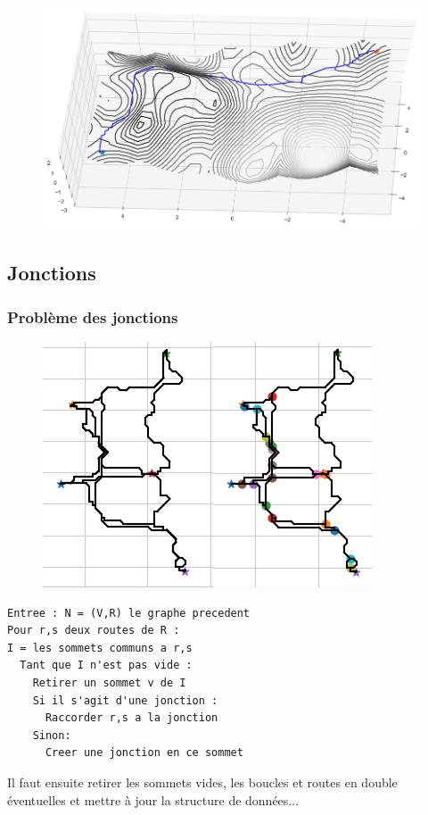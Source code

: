 \documentclass{beamer}[11pt]
\begin{document}
			\begin{frame}
				\begin{figure}[t]
					\centering
						\includegraphics[width=1\textwidth]{Pics/lacets.png}
				\end{figure}
			\end{frame}

		\subsection{Jonctions}

			\begin{frame}
				\frametitle{Problème des jonctions}
				\begin{figure}[t]
					\centering
						\includegraphics[width=.6\textwidth]{Pics/normcomp.png}
				\end{figure}
			\end{frame}

			\begin{frame}[fragile]
				\begin{verbatim}
Entree : N = (V,R) le graphe precedent
Pour r,s deux routes de R :
I = les sommets communs a r,s
  Tant que I n'est pas vide :
    Retirer un sommet v de I
    Si il s'agit d'une jonction :
      Raccorder r,s a la jonction
    Sinon:
      Creer une jonction en ce sommet
\end{verbatim}
			Il faut ensuite retirer les sommets vides, les boucles et routes en double éventuelles et mettre à jour la structure de données...
			\end{frame}
\end{document}
